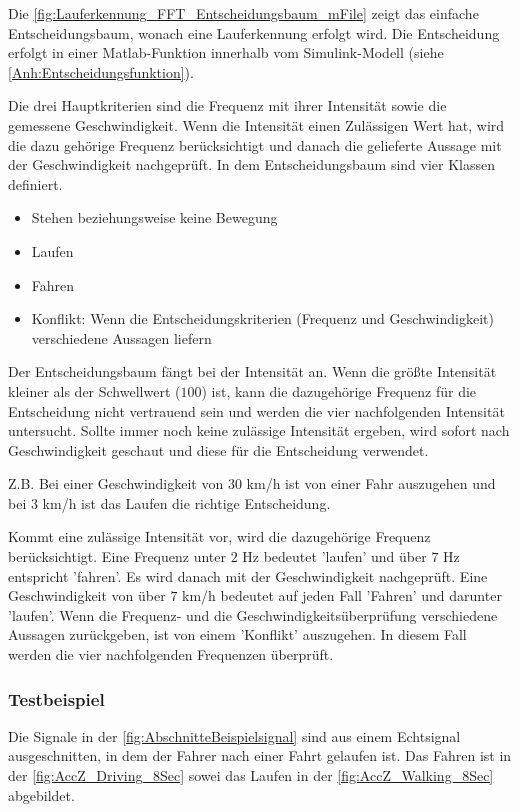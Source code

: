 Die \autoref{fig:Lauferkennung_FFT_Entscheidungsbaum_mFile} zeigt das einfache Entscheidungsbaum, wonach eine Lauferkennung erfolgt wird. Die Entscheidung erfolgt in einer Matlab-Funktion innerhalb vom Simulink-Modell (siehe \autoref{Anh:Entscheidungsfunktion}).

Die drei Hauptkriterien sind die Frequenz mit ihrer Intensität sowie die gemessene Geschwindigkeit. Wenn die Intensität einen Zulässigen Wert hat, wird die dazu gehörige Frequenz berücksichtigt und danach die gelieferte Aussage mit der Geschwindigkeit nachgeprüft.
In dem Entscheidungsbaum sind vier Klassen definiert.
\begin{itemize}
	\item Stehen beziehungsweise keine Bewegung
	\item Laufen
	\item Fahren
	\item Konflikt: Wenn die Entscheidungskriterien (Frequenz und Geschwindigkeit) verschiedene Aussagen liefern
\end{itemize}
Der Entscheidungsbaum fängt bei der Intensität an. Wenn die größte Intensität kleiner als der Schwellwert ($100$) ist, kann die dazugehörige Frequenz für die Entscheidung nicht vertrauend sein und werden die vier nachfolgenden Intensität untersucht. Sollte immer noch keine zulässige Intensität ergeben, wird sofort nach Geschwindigkeit geschaut und diese für die Entscheidung verwendet.

Z.B. Bei einer Geschwindigkeit von $30$ km/h ist von einer Fahr auszugehen und bei $3$ km/h ist das Laufen die richtige Entscheidung.

Kommt eine zulässige Intensität vor, wird die dazugehörige Frequenz berücksichtigt. Eine Frequenz unter $2$ Hz bedeutet 'laufen' und über $7$ Hz entspricht 'fahren'. Es wird danach mit der Geschwindigkeit nachgeprüft. Eine Geschwindigkeit von über $7$ km/h bedeutet auf jeden Fall 'Fahren' und darunter 'laufen'.
Wenn die Frequenz- und die Geschwindigkeitsüberprüfung verschiedene Aussagen zurückgeben, ist von einem 'Konflikt' auszugehen. In diesem Fall werden die vier nachfolgenden Frequenzen überprüft.


\subsubsection{Testbeispiel}
Die Signale in der \autoref{fig:AbschnitteBeispielsignal} sind aus einem Echtsignal ausgeschnitten, in dem der Fahrer nach einer Fahrt gelaufen ist. Das Fahren ist in der \autoref{fig:AccZ_Driving_8Sec} sowei das Laufen in der \autoref{fig:AccZ_Walking_8Sec} abgebildet.

